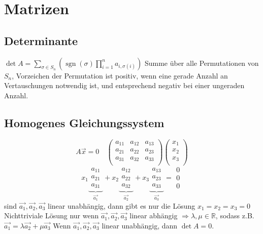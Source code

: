 \documentclass[a4paper]{scrartcl}
\begin{document}
\section{Matrizen}
\label{sec-13}
\subsection{Determinante}
\label{sec-13-1}
$\det A = \sum_{\sigma \in S_n} \left(\operatorname{sgn}(\sigma) \prod_{i=1}^n a_{i, \sigma(i)}\right)$
Summe über alle Permutationen von $S_n$, Vorzeichen der Permutation ist positiv, wenn eine gerade Anzahl an Vertauschungen notwendig ist, und entsprechend negativ bei einer ungeraden Anzahl.
\subsection{Homogenes Gleichungssystem}
\label{sec-13-2}
\[A\vec{x}=0\quad \begin{pmatrix}
   a_{11} & a_{12} & a_{13} \\
   a_{21} & a_{22} & a_{23} \\
   a_{31} & a_{32} & a_{33} \\
   \end{pmatrix}\begin{pmatrix}
   x_1\\
   x_2\\
   x_3\\
   \end{pmatrix}\] 
\[
   x_1 \underbrace{ \begin{matrix} a_{11} \\ a_{21} \\ a_{31} \end{matrix}}_{\vec{a_1}} +
   x_2 \underbrace{ \begin{matrix} a_{12} \\ a_{22} \\ a_{32} \end{matrix}}_{\vec{a_2}} +
   x_3 \underbrace{ \begin{matrix} a_{13} \\ a_{23} \\ a_{33} \end{matrix}}_{\vec{a_3}}
   = \begin{matrix} 0 \\ 0 \\ 0\end{matrix}
   \]
sind $\vec{a_1},\vec{a_2}, \vec{a_3}$ linear unabhängig, dann gibt es nur die Lösung $x_1=x_2=x_3=0$
Nichttriviale Lösung nur wenn $\vec{a_1},\vec{a_2}, \vec{a_3}$ linear abhängig $\Rightarrow \lambda,\mu\in\mathbb{R}$, sodass z.B. $\vec{a_1} = \lambda\vec{a_2} + \mu\vec{a_3}$
Wenn $\vec{a_1},\vec{a_2}, \vec{a_3}$ linear unabhängig, dann $\det A = 0$.
\end{document}
